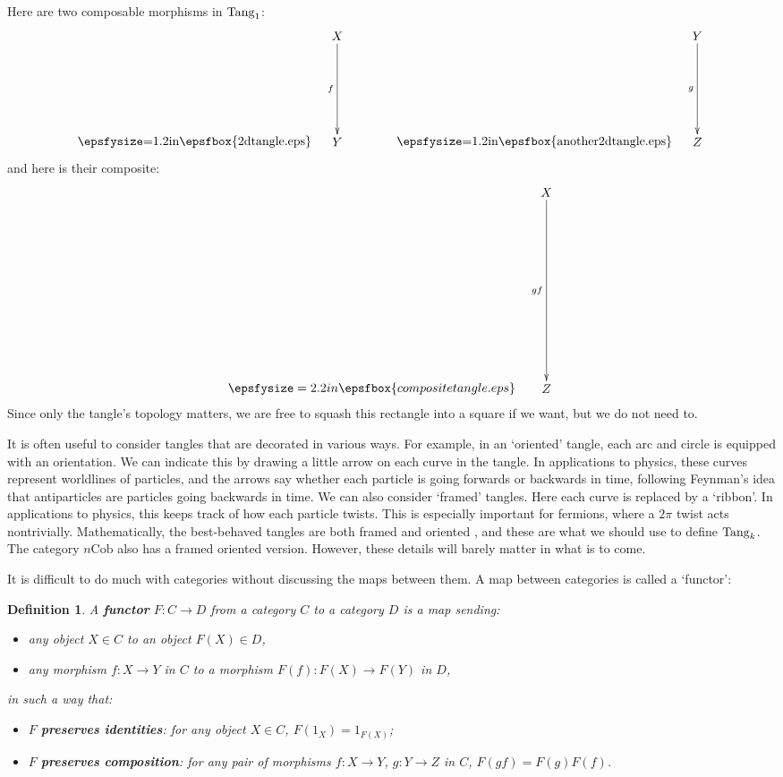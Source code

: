 \documentclass[12pt]{article}
\newtheorem{definition}[thm]{Definition}
\newcommand{\Cob}{\mathrm{Cob}}
\newcommand{\Tang}{{\rm Tang}}
\newcommand{\maps}{\colon}
\begin{document}
Here are two composable morphisms in $\Tang_1$:
\[
\text{\epsfysize=1.2in\epsfbox{2dtangle.eps}} 
\quad
 \xy
 {\ar_{f} (0,30)*+{X}; (0,0)*+{Y}};
 \endxy
\qquad \qquad
\text{\epsfysize=1.2in\epsfbox{another2dtangle.eps}}
\quad
 \xy
 {\ar_{g} (0,30)*+{Y}; (0,0)*+{Z}};
 \endxy
\]
and here is their composite:
\[  
\epsfysize=2.2in\epsfbox{compositetangle.eps}
\quad
 \xy
 {\ar_{gf} (0,55)*+{X}; (0,0)*+{Z}};
 \endxy
\]
Since only the tangle's topology matters, we are free to squash
this rectangle into a square if we want, but we do not need to.

It is often useful to consider tangles that are decorated in 
various ways.  For example, in an `oriented' tangle, each arc and 
circle is equipped with an orientation.  We can indicate this by
drawing a little arrow on each curve in the tangle.  In applications 
to physics, these curves represent worldlines of particles, and the arrows 
say whether each particle is going forwards or backwards in time, following 
Feynman's idea that antiparticles are particles going backwards in time.
We can also consider `framed' tangles.  Here each curve is replaced by 
a `ribbon'.  In applications to physics, this keeps track of how each 
particle twists.  This is especially important for fermions, where a 
$2\pi$ twist acts nontrivially.  Mathematically, the best-behaved tangles
are both framed and oriented \cite{BD,Shum}, and these are what we
should use to define $\Tang_k$.  The category $n\Cob$ also has a framed
oriented version.  However, these details will barely matter in what
is to come.

It is difficult to do much with categories without discussing the maps
between them.  A map between categories is called a `functor':

\begin{definition} 
A {\bf functor} $F\maps C\to D$ from a category $C$ to a category $D$
is a map sending:
\begin{itemize}
\item any object $X \in C$ to an object $F(X) \in D$,
\item any morphism $f\maps X\to Y$ in $C$ to a morphism $F(f)\maps F(X)\to F(Y)$ 
in $D$,
\end{itemize}
in such a way that:
\begin{itemize}
\item $F$ {\bf preserves identities}: for any object $X \in C$,
$F(1_X) = 1_{F(X)}$;
\item $F$ {\bf preserves composition}: for
any pair of morphisms $f \maps X \to Y$, $g \maps Y \to Z$ in $C$,
$F(gf) = F(g) F(f)$.
\end{itemize}
\end{definition}
\end{document}
